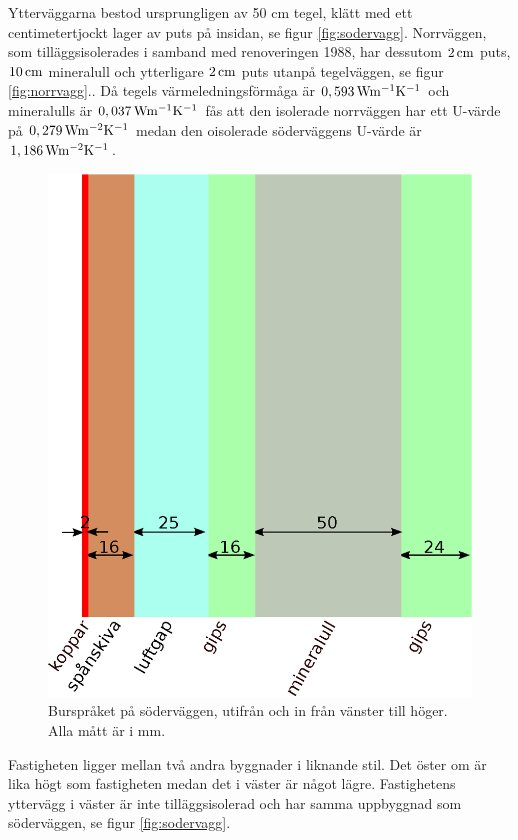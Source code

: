 Ytterväggarna bestod ursprungligen av 50 cm tegel, klätt med ett centimetertjockt lager av puts på insidan,
se figur \ref{fig:sodervagg}. Norrväggen, som tilläggsisolerades i samband med renoveringen 1988, har dessutom
$\unit[2]{ cm}$ puts, $\unit[10]{ cm}$ mineralull och ytterligare $\unit[2]{ cm}$ puts utanpå tegelväggen,
se figur \ref{fig:norrvagg}.\cite{kandidatarbete2010}\cite{petersarneo}. Då tegels värmeledningsförmåga är
$\unit[0,593]{Wm^{-1}K^{-1}}$ och mineralulls är $\unit[0,037]{Wm^{-1}K^{-1}}$
fås att den isolerade norrväggen har ett U-värde på $\unit[0,279]{Wm^{-2}K^{-1}}$
medan den oisolerade söderväggens U-värde är $\unit[1,186]{Wm^{-2}K^{-1}}$.

\begin{figure}[hpbt]
\centering
\includegraphics[width=0.3\textheight]{images/bursprak.eps}
\caption{\label{fig:bursprak}{Burspråket på söderväggen, utifrån och in från vänster till höger. Alla mått är i mm.}}
\end{figure}

Fastigheten ligger mellan två andra byggnader i liknande stil. Det öster om är lika högt som fastigheten medan det i väster är något lägre. Fastighetens yttervägg i väster är inte tilläggsisolerad och har samma uppbyggnad som söderväggen, se figur \ref{fig:sodervagg}.

